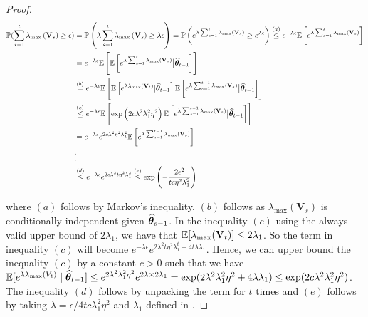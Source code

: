\begin{proof}
\begin{align*} 
\mathbb{P}(\sum_{s=1}^t \lambda_{\max}\left(\mathbf{V}_s\right) \geq  \epsilon) &=\mathbb{P}\left(\lambda\sum_{s=1}^{t} \lambda_{\max}\left(\mathbf{V}_s\right) \geq \lambda\epsilon\right) 
=\mathbb{P}\left(e^{\lambda \sum_{s=1}^{t} \lambda_{\max}\left(\mathbf{V}_s\right)} \geq e^{\lambda \epsilon}\right) \overset{(a)}{\leq} e^{-\lambda \epsilon} \mathbb{E}\left[e^{\lambda \sum_{s=1}^{t} \lambda_{\max}\left(\mathbf{V}_s\right)}\right] \\
&=  e^{-\lambda \epsilon} \mathbb{E}\left[\mathbb{E}\left[e^{\lambda \sum_{s=1}^{t} \lambda_{\max}\left(\mathbf{V}_s\right)}\big|{\widehat{\bm{\theta}}}_{t-1}\right] \right]\\
&\overset{(b)}{=} e^{-\lambda \epsilon} \mathbb{E}\left[\mathbb{E}\left[e^{\lambda  \lambda_{\max}(\mathbf{V}_{t})}|{\widehat{\bm{\theta}}}_{t-1}\right]\mathbb{E}\left[e^{\lambda \sum_{s=1}^{t-1} \lambda_{\max}\left(\mathbf{V}_s\right)} \big|{\widehat{\bm{\theta}}}_{t-1}\right]  \right]\\
&\overset{(c)}{\leq} e^{-\lambda \epsilon} \mathbb{E}\left[\exp\left(2c\lambda^2\lambda^2_1\eta^2\right)\mathbb{E}\left[e^{\lambda \sum_{s=1}^{t-1} \lambda_{\max}\left(\mathbf{V}_s\right)}\big |{\widehat{\bm{\theta}}}_{t-1}\right]  \right]\\
& \overset{}{=} e^{-\lambda \epsilon} e^{2c\lambda^{2} \eta^{2}\lambda_1^2} \mathbb{E}\left[e^{\lambda \sum_{s=1}^{t-1} \lambda_{\max}\left(\mathbf{V}_s\right)}\right] \\ 
& \vdots \\ 
& \overset{(d)}{\leq} e^{-\lambda \epsilon} e^{2c\lambda^{2} t \eta^{2}\lambda^2_1} \overset{(e)}{\leq} \exp\left(-\dfrac{2\epsilon^2}{tc\eta^2\lambda_1^2}\right)
\end{align*}

where $(a)$ follows by Markov's inequality, $(b)$ follows as $\lambda_{\max}(\mathbf{V}_s)$ is conditionally independent given ${\widehat{\bm{\theta}}}_{s-1}$. In the inequality $(c)$ using the always valid upper bound of $2\lambda_1$, we have that $\mathbb{E}[\lambda_{\max}(\mathbf{V}_t)] \leq 2\lambda_1$. So the term in inequality $(c)$ will become 
$e^{-\lambda \epsilon} e^{2\lambda^2 t\eta^2 \lambda_1^t + 4t\lambda \lambda_1}$. Hence, we can upper bound the inequality $(c)$ by a constant $c > 0$ such that we have $\mathbb{E}[e^{\lambda \lambda_{\max}(V_t)} \mid {\widehat{\bm{\theta}}}_{t-1}] \leq e^{2\lambda^2\lambda_1^2\eta^2}e^{2\lambda \times 2\lambda_1} = \exp(2\lambda^2\lambda_1^2\eta^2 + 4 \lambda \lambda_1) \leq  \exp(2c\lambda^2\lambda_1^2\eta^2)$. The inequality $(d)$ follows by unpacking the term for $t$ times and $(e)$  follows by taking $\lambda= \epsilon / 4tc\lambda_1^2\eta^2$ and $\lambda_1$ defined in .
\end{proof}


